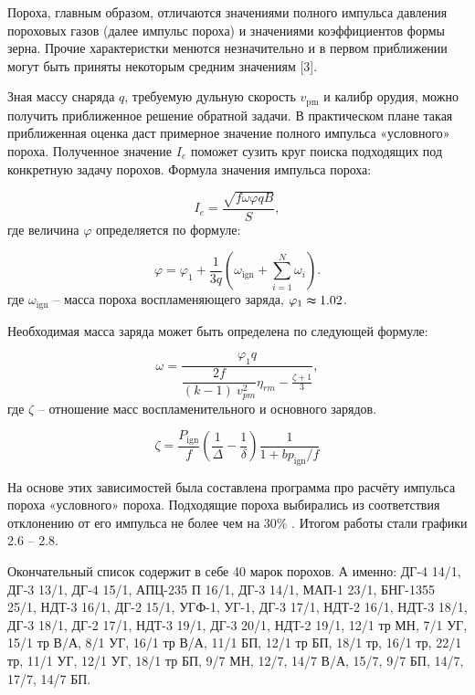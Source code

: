 \documentclass[14pt, a4paper]{extreport} %
\begin{document}
Пороха, главным образом, отличаются значениями полного импульса давления пороховых газов (далее импульс пороха) и значениями
коэффициентов формы зерна. Прочие характеристки менются незначительно и в первом приближении могут быть приняты некоторым средним значениям [3].

Зная массу снаряда $q$, требуемую дульную скорость $v_\text{pm}$ и калибр орудия, можно получить приближенное решение обратной задачи. В практическом плане 
такая приближенная оценка даст примерное значение полного импульса «условного» пороха. Полученное значение $I_e$ поможет сузить круг поиска подходящих под конкретную задачу порохов.
Формула значения импульса пороха: 

\begin{equation}
I_e = \frac{\sqrt{f \omega \varphi q B}}{S},
\end{equation}
где величина $\varphi$ определяется по формуле:

\begin{equation}
\varphi = \varphi_1 + \frac{1}{3q} \left( \omega_{\text{ign}} + \sum_{i=1}^{N} \omega_i \right).
\end{equation}
где $\omega_\text{ign}$ -- масса пороха воспламеняющего заряда, $\varphi_1 \thickapprox  1.02$.

Необходимая масса заряда может быть определена по следующей формуле: 

\begin{equation}
    \omega = \frac{\varphi_1 q}{\dfrac{2f}{(k-1)\ v^2_{pm}} \eta_{rm} - \frac{\zeta + 1}{3}},
\end{equation}
где $\zeta$ -- отношение масс воспламенительного и основного зарядов.

\begin{equation}
\zeta = \frac{P_{\mathrm{ign}}}{f} \left( \frac{1}{\Delta} - \frac{1}{\delta} \right) \frac{1}{1 + b p_{\mathrm{ign}} / f}
\end{equation}

На основе этих зависимостей была составлена программа про расчёту импульса пороха «условного»
пороха. Подходящие пороха выбирались из соответствия отклонению от его импульса не более чем на 30\% . Итогом работы стали графики 2.6 -- 2.8. 

Окончательный список содержит в себе 40 марок порохов. А именно: ДГ-4 14/1, ДГ-3 13/1, ДГ-4 15/1, АПЦ-235 П 16/1, ДГ-3 14/1, МАП-1 23/1, БНГ-1355 25/1, НДТ-3 16/1, ДГ-2 15/1, УГФ-1, УГ-1, ДГ-3 17/1, НДТ-2 16/1, НДТ-3 18/1, ДГ-3 18/1, ДГ-2 17/1, НДТ-3 19/1, ДГ-3 20/1, НДТ-2 19/1, 12/1 тр МН, 7/1 УГ, 15/1 тр В/А, 8/1 УГ, 16/1 тр В/А, 11/1 БП, 12/1 тр БП, 18/1 тр, 16/1 тр, 22/1 тр, 11/1 УГ, 12/1 УГ, 18/1 тр БП, 9/7 МН, 12/7, 14/7 В/А, 15/7, 9/7 БП, 14/7, 17/7, 14/7 БП.
\end{document}
